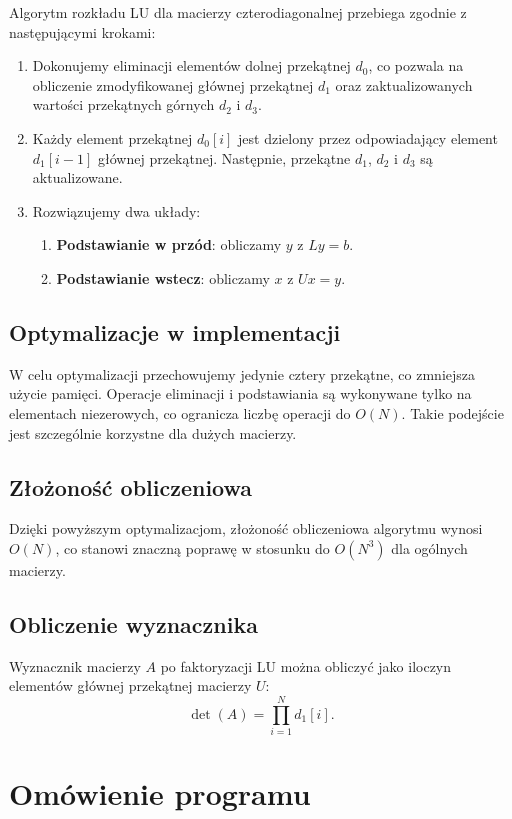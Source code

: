 \documentclass[a4paper,12pt]{article}
\begin{document}
Algorytm rozkładu LU dla macierzy czterodiagonalnej przebiega zgodnie z następującymi krokami:
\begin{enumerate}
    \item Dokonujemy eliminacji elementów dolnej przekątnej $d_0$, co pozwala na obliczenie zmodyfikowanej głównej przekątnej $d_1$ oraz zaktualizowanych wartości przekątnych górnych $d_2$ i $d_3$.
    \item Każdy element przekątnej $d_0[i]$ jest dzielony przez odpowiadający element $d_1[i-1]$ głównej przekątnej. Następnie, przekątne $d_1$, $d_2$ i $d_3$ są aktualizowane.
    \item Rozwiązujemy dwa układy:
    \begin{enumerate}
        \item \textbf{Podstawianie w przód}: obliczamy $y$ z $Ly = b$.
        \item \textbf{Podstawianie wstecz}: obliczamy $x$ z $Ux = y$.
    \end{enumerate}
\end{enumerate}

\subsection{Optymalizacje w implementacji}

W celu optymalizacji przechowujemy jedynie cztery przekątne, co zmniejsza użycie pamięci. Operacje eliminacji i podstawiania są wykonywane tylko na elementach niezerowych, co ogranicza liczbę operacji do $O(N)$. Takie podejście jest szczególnie korzystne dla dużych macierzy.

\subsection{Złożoność obliczeniowa}

Dzięki powyższym optymalizacjom, złożoność obliczeniowa algorytmu wynosi $O(N)$, co stanowi znaczną poprawę w stosunku do $O(N^3)$ dla ogólnych macierzy.

\subsection{Obliczenie wyznacznika}

Wyznacznik macierzy $A$ po faktoryzacji LU można obliczyć jako iloczyn elementów głównej przekątnej macierzy $U$:
\[
\det(A) = \prod_{i=1}^N d_1[i].
\]

\section{Omówienie programu}
\end{document}
